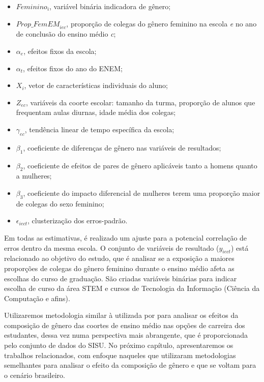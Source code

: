 \begin{itemize}
  \item $\textit{Feminino}_i$, variável binária indicadora de gênero;
  \item $\textit{Prop\_FemEM}_{iec}$, proporção de colegas do gênero feminino na escola \textit{e} no ano de conclusão do ensino médio \textit{c};
  \item $\alpha_e$, efeitos fixos da escola;
  \item $\alpha_t$, efeitos fixos do ano do ENEM;
  \item $X_i$, vetor de características individuais do aluno;
  \item $Z_{ec}$, variáveis da coorte escolar: tamanho da turma, proporção de alunos que frequentam aulas diurnas, idade média dos colegas;
  \item $\gamma_{ec}$, tendência linear de tempo específica da escola;
  \item $\beta_1$, coeficiente de diferenças de gênero nas variáveis de resultados;
  \item $\beta_2$, coeficiente de efeitos de pares de gênero aplicáveis tanto a homens quanto a mulheres;
  \item $\beta_3$, coeficiente do impacto diferencial de mulheres terem uma proporção maior de colegas do sexo feminino;
  \item $\epsilon_{iect}$, clusterização dos erros-padrão.
\end{itemize}

Em todas as estimativas, é realizado um ajuste para a potencial correlação de erros dentro da mesma escola. O conjunto de variáveis de resultado ($y_{iect}$) está relacionado ao objetivo do estudo, que é analisar se a exposição a maiores proporções de colegas do gênero feminino durante o ensino médio afeta as escolhas do curso de graduação. São criadas variáveis binárias para indicar escolha de curso da área STEM e cursos de Tecnologia da Informação (Ciência da Computação e afins).

Utilizaremos metodologia similar à utilizada por \citet{Borges2021} para analisar os efeitos da composição de gênero das coortes de ensino médio nas opções de carreira dos estudantes, dessa vez numa perspectiva mais abrangente, que é proporcionada pelo conjunto de dados do SISU. No próximo capítulo, apresentaremos os trabalhos relacionados, com enfoque naqueles que utilizaram metodologias semelhantes para analisar o efeito da composição de gênero e que se voltam para o cenário brasileiro.